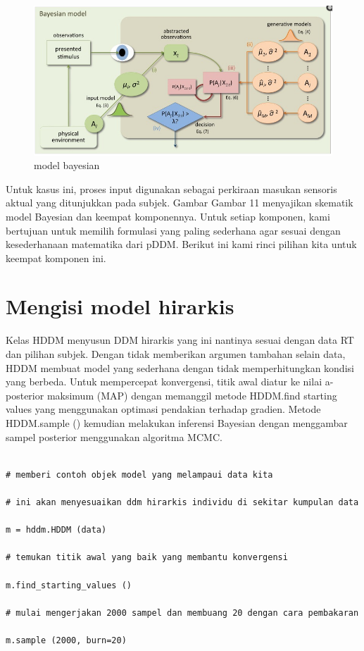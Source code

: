 	\begin{figure}[ht]
	\centerline{\includegraphics[width=1\textwidth]{figures/bayesian.PNG}}
	\caption{model bayesian}
	\label{bayesian}
	\end{figure}

Untuk kasus ini, proses input digunakan sebagai perkiraan masukan sensoris aktual yang ditunjukkan pada subjek. Gambar Gambar 11 menyajikan skematik model Bayesian dan keempat komponennya. Untuk setiap komponen, kami bertujuan untuk memilih formulasi yang paling sederhana agar sesuai dengan kesederhanaan matematika dari pDDM. Berikut ini kami rinci pilihan kita untuk keempat komponen ini.

\section {Mengisi model hirarkis}
Kelas HDDM menyusun DDM hirarkis yang ini nantinya sesuai dengan data RT dan pilihan subjek. 
Dengan tidak memberikan argumen tambahan selain data, HDDM membuat model yang sederhana dengan tidak memperhitungkan kondisi yang  berbeda. 
Untuk mempercepat konvergensi, titik awal diatur ke nilai a-posterior maksimum (MAP) dengan memanggil metode HDDM.find starting values yang menggunakan optimasi pendakian terhadap gradien. 
Metode HDDM.sample () kemudian melakukan inferensi Bayesian dengan menggambar sampel posterior menggunakan algoritma MCMC.

\begin{verbatim}

# memberi contoh objek model yang melampaui data kita

# ini akan menyesuaikan ddm hirarkis individu di sekitar kumpulan data

m = hddm.HDDM (data)

# temukan titik awal yang baik yang membantu konvergensi

m.find_starting_values ()

# mulai mengerjakan 2000 sampel dan membuang 20 dengan cara pembakaran

m.sample (2000, burn=20)

\end{verbatim}

